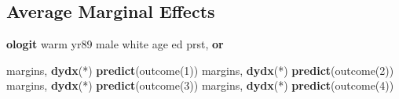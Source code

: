 \documentclass[
]{book}
\newenvironment{Shaded}{\begin{snugshade}}{\end{snugshade}}
\newcommand{\BaseNTok}[1]{\textcolor[rgb]{0.00,0.00,0.81}{#1}}
\newcommand{\KeywordTok}[1]{\textcolor[rgb]{0.13,0.29,0.53}{\textbf{#1}}}
\newcommand{\NormalTok}[1]{#1}
\begin{document}
\subsection{Average Marginal Effects}\label{average-marginal-effects-1}

\begin{Shaded}
\begin{Highlighting}[]
\KeywordTok{ologit}\NormalTok{ warm yr89 male }\BaseNTok{white}\NormalTok{ age ed prst, }\KeywordTok{or}

\NormalTok{margins, }\KeywordTok{dydx}\NormalTok{(*) }\KeywordTok{predict}\NormalTok{(outcome(1))}
\NormalTok{margins, }\KeywordTok{dydx}\NormalTok{(*) }\KeywordTok{predict}\NormalTok{(outcome(2))}
\NormalTok{margins, }\KeywordTok{dydx}\NormalTok{(*) }\KeywordTok{predict}\NormalTok{(outcome(3))}
\NormalTok{margins, }\KeywordTok{dydx}\NormalTok{(*) }\KeywordTok{predict}\NormalTok{(outcome(4))}
\end{Highlighting}
\end{Shaded}
\end{document}
